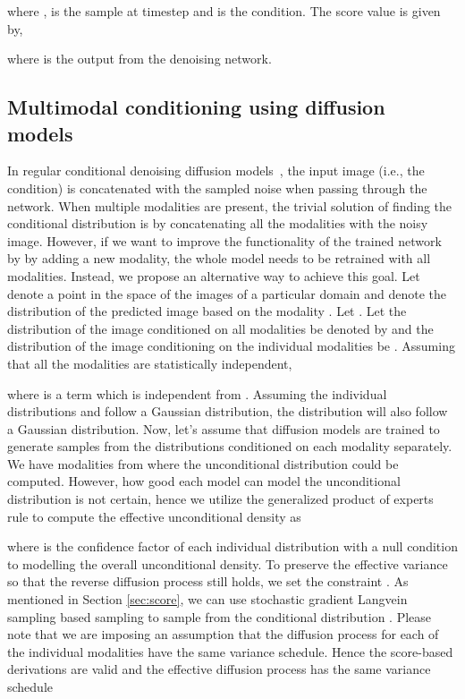\documentclass[10pt,twocolumn,letterpaper]{article}
\begin{document}
where ,  is the sample at timestep  and  is the condition. The score value   is  given by,

 where  is the output from the denoising network.
 



\subsection{Multimodal conditioning using diffusion models}
In regular conditional denoising diffusion models~\cite{saharia2021image}, the input image (i.e., the condition) is concatenated  with the sampled noise when passing through the network. When multiple modalities are present, the trivial solution of finding the conditional distribution is by concatenating all the  modalities with the noisy image. However, if we want to improve the functionality of the trained network by by adding a new modality, the whole model needs to be retrained with all  modalities. Instead, we propose an alternative way to achieve this goal. Let  denote a point in the space of the images of a particular domain and  denote the distribution of the predicted image  based on the modality .  Let . Let the distribution of the image conditioned on all modalities be denoted by 
and the distribution of the image conditioning on the individual modalities be .  Assuming that all the modalities are statistically independent,

where  is a term which is independent from . Assuming the individual distributions  and  follow a Gaussian distribution, the distribution  will also follow a Gaussian distribution.
Now, let's assume that  diffusion models are trained to generate samples from the distributions  conditioned on each modality  separately. 
We have  modalities from where the unconditional distribution could be computed.  However, how good each model can model the unconditional distribution is not certain, hence we utilize the generalized product of experts rule \cite{cao2014generalized} to compute the effective unconditional density as
 
where  is the confidence factor of each individual distribution with a null condition to modelling the overall unconditional density. To preserve the effective variance so that the reverse diffusion process still holds,  we set the constraint  .
  As mentioned in Section \ref{sec:score}, we can use stochastic gradient Langvein sampling based sampling to sample from the conditional distribution  . Please note that we are imposing an assumption that the diffusion process for each of the individual modalities have the same variance schedule. Hence the score-based derivations are valid and the effective diffusion process has the same variance schedule
 
\end{document}
